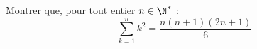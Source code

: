 \begin{exercice}
Montrer que, pour tout entier $n\in\N^*$ : \[\sum_{k=1}^{n}k^2=\frac{n(n+1)(2n+1)}{6}\] 
 

 \end{exercice}
